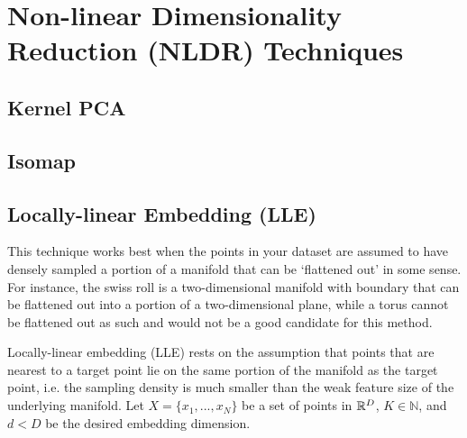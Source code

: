 \documentclass{gtpart}
\theoremstyle{definition}
\begin{document}
\section{Non-linear Dimensionality Reduction (NLDR) Techniques}

\subsection{Kernel PCA}

\subsection{Isomap}

\subsection{Locally-linear Embedding (LLE)}

This technique works best when the points in your dataset are assumed to have densely sampled a portion of a manifold that can be `flattened out' in some sense. For instance, the swiss roll is a two-dimensional manifold with boundary that can be flattened out into a portion of a two-dimensional plane, while a torus cannot be flattened out as such and would not be a good candidate for this method.

Locally-linear embedding (LLE) rests on the assumption that points that are nearest to a target point lie on the same portion of the manifold as the target point, i.e. the sampling density is much smaller than the weak feature size of the underlying manifold. Let $X = \{x_1, ..., x_N\}$ be a set of points in $\mathbb{R}^D$, $K \in \mathbb{N}$, and $d < D$ be the desired embedding dimension. 
\end{document}
